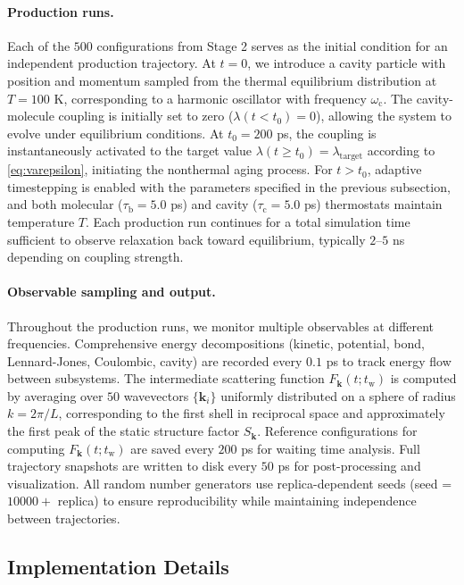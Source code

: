 \documentclass[%
 reprint,
 amsmath,amssymb,
 aps,
]{revtex4-2}
\begin{document}
\paragraph*{Production runs.}
Each of the $500$ configurations from Stage 2 serves as the initial condition for an independent production trajectory.
At $t = 0$, we introduce a cavity particle with position and momentum sampled from the thermal equilibrium distribution at $T = 100$ K, corresponding to a harmonic oscillator with frequency $\omega_\mathrm{c}$.
The cavity-molecule coupling is initially set to zero ($\lambda(t < t_0) = 0$), allowing the system to evolve under equilibrium conditions.
At $t_0 = 200$ ps, the coupling is instantaneously activated to the target value $\lambda(t \geq t_0) = \lambda_\mathrm{target}$ according to \cref{eq:varepsilon}, initiating the nonthermal aging process.
For $t > t_0$, adaptive timestepping is enabled with the parameters specified in the previous subsection, and both molecular ($\tau_\mathrm{b} = 5.0$ ps) and cavity ($\tau_\mathrm{c} = 5.0$ ps) thermostats maintain temperature $T$.
Each production run continues for a total simulation time sufficient to observe relaxation back toward equilibrium, typically $2$--$5$ ns depending on coupling strength.

\paragraph*{Observable sampling and output.}
Throughout the production runs, we monitor multiple observables at different frequencies.
Comprehensive energy decompositions (kinetic, potential, bond, Lennard-Jones, Coulombic, cavity) are recorded every $0.1$ ps to track energy flow between subsystems.
The intermediate scattering function $F_{\bm{k}}(t; t_\mathrm{w})$ is computed by averaging over $50$ wavevectors $\{\bm{k}_i\}$ uniformly distributed on a sphere of radius $k = 2\pi/L$, corresponding to the first shell in reciprocal space and approximately the first peak of the static structure factor $S_{\bm{k}}$.
Reference configurations for computing $F_{\bm{k}}(t; t_\mathrm{w})$ are saved every $200$ ps for waiting time analysis.
Full trajectory snapshots are written to disk every $50$ ps for post-processing and visualization.
All random number generators use replica-dependent seeds (seed = $10000 +$ replica) to ensure reproducibility while maintaining independence between trajectories.

\subsection{Implementation Details}
\end{document}
